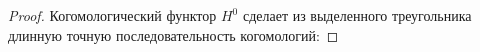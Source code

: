 \documentclass[../hw_main.tex]{subfiles}
\begin{document}
\begin{proof}
\bee
{}
\eee
 Когомологический функтор $H^0$ сделает из выделенного треугольника длинную точную последовательность когомологий:
 \bee
{}
\eee
\end{proof}
\end{document}
